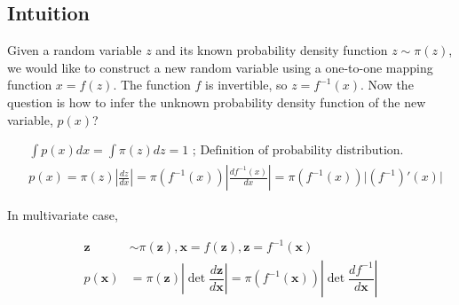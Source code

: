 \subsection{Intuition}
Given a random variable $z$ and its known probability density function $z\sim \pi(z)$, we would like to construct a new random variable using a one-to-one mapping function $x=f(z)$. The function $f$ is invertible, so $z = f^{-1}(x)$. Now the question is how to infer the unknown probability density function of the new variable, $p(x)$?

$$
\begin{aligned}
& \int p(x)dx = \int \pi(z)dz = 1 \scriptstyle{\text{   ; Definition of probability distribution.}}\\
& p(x) = \pi(z) \left\vert\frac{dz}{dx}\right\vert = \pi(f^{-1}(x)) \left\vert\frac{d f^{-1}(x)}{dx}\right\vert = \pi(f^{-1}(x)) \vert (f^{-1})'(x) \vert
\end{aligned}$$

In multivariate case, 

\begin{align}
\mathbf{z} &\sim \pi(\mathbf{z}), \mathbf{x} = f(\mathbf{z}), \mathbf{z} = f^{-1}(\mathbf{x}) \\
p(\mathbf{x}) 
&= \pi(\mathbf{z}) \left\vert \det \dfrac{d \mathbf{z}}{d \mathbf{x}} \right\vert  
= \pi(f^{-1}(\mathbf{x})) \left\vert \det \dfrac{d f^{-1}}{d \mathbf{x}} \right\vert
\end{align}









